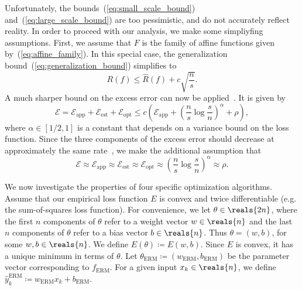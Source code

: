 \documentclass[11pt,a4paper]{article}
\numberwithin{equation}{section}
\newcommand{\apperr}{\mathcal{E}_{\mathrm{app}}}
\newcommand{\esterr}{\mathcal{E}_{\mathrm{est}}}
\newcommand{\opterr}{\mathcal{E}_{\mathrm{opt}}}
\begin{document}
Unfortunately, the bounds~(\ref{eq:small_scale_bound})
and~(\ref{eq:large_scale_bound}) are too pessimistic, and do not accurately
reflect reality. In order to proceed with our analysis, we make some simpliyfing
assumptions. First, we assume that $F$ is the family of affine functions given
by~(\ref{eq:affine_family}). In this special case, the generalization
bound~(\ref{eq:generalization_bound}) simplifies to
\[
	R(f) \leq \hat{R}(f) + c \sqrt{\frac{n}{s}}.
\]
A much sharper bound on the excess error can now be
applied~\citep{bousquet2008tradeoffs}. It is given by
\begin{equation}
	\mathcal{E}
	= \apperr + \esterr + \opterr
	\leq c \left( \apperr + \left(\frac{n}{s}\log\frac{s}{n}\right)^\alpha +
		\rho \right),
	\label{eq:fast_rate_bound}
\end{equation}
where $\alpha \in [1/2, 1]$ is a constant that depends on a variance bound on
the loss function. Since the three components of the excess error should
decrease at approximately the same rate~\citep{bousquet2008tradeoffs}, we make
the additional assumption that
\begin{equation}
	\mathcal{E} \approx \apperr \approx \esterr \approx \opterr \approx
		\left(\frac{n}{s}\log\frac{s}{n}\right)^\alpha \approx \rho.
	\label{eq:error_equiv}
\end{equation}

We now investigate the properties of four specific optimization algorithms.
Assume that our empirical loss function $E$ is convex and twice differentiable
(e.g. the sum-of-squares loss function). For convenience, we let $\theta \in
\reals{2n}$, where the first $n$ components of $\theta$ refer to a weight vector
$w \in \reals{n}$ and the last $n$ components of $\theta$ refer to a bias vector
$b \in \reals{n}$. Thus $\theta = (w, b)$, for some $w, b \in \reals{n}$. We
define $E(\theta) \coloneqq E(w, b)$. Since $E$ is convex, it has a unique
minimum in terms of $\theta$. Let $\theta_{\text{ERM}} \coloneqq
(w_{\text{ERM}}, b_{\text{ERM}})$ be the parameter vector corresponding to
$f_{\text{ERM}}$. For a given input $x_k \in \reals{n}$, we define
$\hat{y}_k^{\text{ERM}} \coloneqq w_{\text{ERM}} x_k + b_{\text{ERM}}$.
\end{document}
